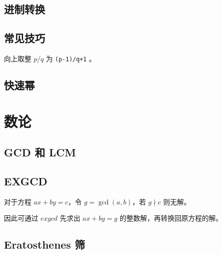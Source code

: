 \documentclass[cn,11pt,black,normal,founder]{elegantbook}
\begin{document}
\section{进制转换}



\section{常见技巧}

向上取整 $p/q$ 为 \lstinline[style=cpp]{(p-1)/q+1} 。

%


%

\section{快速幂} %




\chapter{数论}

\section{GCD 和 LCM} %



\section{EXGCD} %

对于方程 $ax+by=c$，令 $g=\gcd(a,b)$，若 $g\nmid c$ 则无解。

因此可通过 $exgcd$ 先求出 $ax+by=g$ 的整数解，再转换回原方程的解。





\section{Eratosthenes 筛}
\end{document}
